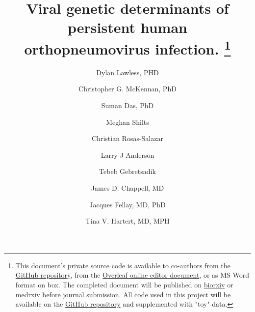 \documentclass{article}
\begin{document}
\date{} %
\title{\Large \bf Viral genetic determinants of persistent human orthopneumovirus infection.
\footnote{This document's private source code is available to co-authors from the 
\href{https://github.com/DylanLawless/inspire_manscript}{GitHub repository}, from the 
\href{https://www.overleaf.com/project/61718a4e077acc3d20ee68f1}{Overleaf online editor document}, or as MS Word format on box. The completed document will be published on 
\href{https://www.biorxiv.org}{biorxiv} or \href{https://www.medrxiv.org}{medrxiv} before journal submission.
All code used in this project will be available on the 
\href{https://github.com/DylanLawless/inspire_manscript}{GitHub repository} and supplemented with "toy" data.}
}

\author[1]{\rm Dylan Lawless, PHD}
\author[2]{\rm Christopher G. McKennan, PhD}
\author[]{\rm Suman Das, PhD}
\author[]{\rm Meghan Shilts}
\author[]{\rm Christian Rosas-Salazar}
\author[]{\rm Larry J Anderson}
\author[]{\rm  Tebeb Gebretsadik}
\author[3]{\rm James D. Chappell, MD}
\author[1]{\rm Jacques Fellay, MD, PhD }
\author[3,4]{\rm Tina V. Hartert, MD, MPH}




\maketitle

\end{document}
